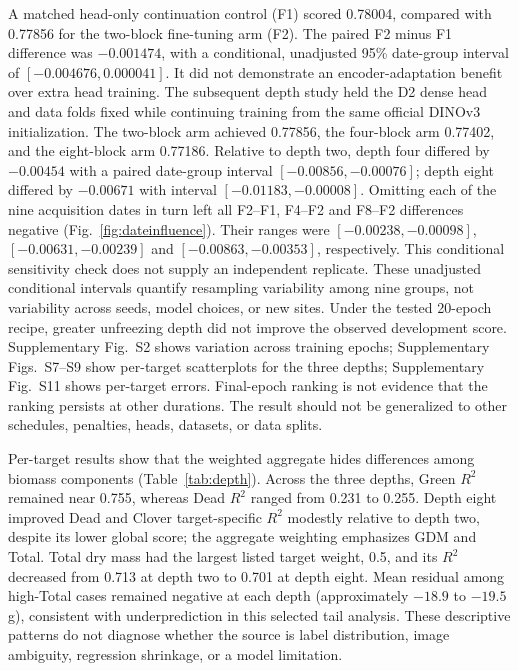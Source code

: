 \documentclass[pdflatex,a4paper,sn-nature]{sn-jnl}
\begin{document}
A matched head-only continuation control (F1) scored 0.78004, compared with 0.77856 for the two-block fine-tuning arm (F2). The paired F2 minus F1 difference was $-0.001474$, with a conditional, unadjusted 95\% date-group interval of $[-0.004676,0.000041]$. It did not demonstrate an encoder-adaptation benefit over extra head training. The subsequent depth study held the D2 dense head and data folds fixed while continuing training from the same official DINOv3 initialization. The two-block arm achieved 0.77856, the four-block arm 0.77402, and the eight-block arm 0.77186. Relative to depth two, depth four differed by $-0.00454$ with a paired date-group interval $[-0.00856,-0.00076]$; depth eight differed by $-0.00671$ with interval $[-0.01183,-0.00008]$. Omitting each of the nine acquisition dates in turn left all F2--F1, F4--F2 and F8--F2 differences negative (Fig.~\ref{fig:dateinfluence}). Their ranges were $[-0.00238,-0.00098]$, $[-0.00631,-0.00239]$ and $[-0.00863,-0.00353]$, respectively. This conditional sensitivity check does not supply an independent replicate. These unadjusted conditional intervals quantify resampling variability among nine groups, not variability across seeds, model choices, or new sites. Under the tested 20-epoch recipe, greater unfreezing depth did not improve the observed development score. Supplementary Fig.~S2 shows variation across training epochs; Supplementary Figs.~S7--S9 show per-target scatterplots for the three depths; Supplementary Fig.~S11 shows per-target errors. Final-epoch ranking is not evidence that the ranking persists at other durations. The result should not be generalized to other schedules, penalties, heads, datasets, or data splits.

Per-target results show that the weighted aggregate hides differences among biomass components (Table~\ref{tab:depth}). Across the three depths, Green $R^2$ remained near 0.755, whereas Dead $R^2$ ranged from 0.231 to 0.255. Depth eight improved Dead and Clover target-specific $R^2$ modestly relative to depth two, despite its lower global score; the aggregate weighting emphasizes GDM and Total. Total dry mass had the largest listed target weight, 0.5, and its $R^2$ decreased from 0.713 at depth two to 0.701 at depth eight. Mean residual among high-Total cases remained negative at each depth (approximately $-18.9$ to $-19.5$ g), consistent with underprediction in this selected tail analysis. These descriptive patterns do not diagnose whether the source is label distribution, image ambiguity, regression shrinkage, or a model limitation.
\end{document}
